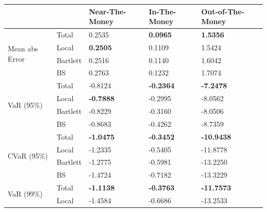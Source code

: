 \documentclass[letterpaper,12pt,titlepage,oneside,final]{book}
\numberwithin{equation}{section}
\theoremstyle{definition}
\begin{document}
\begin{table}[htp!]
	\centering
	\begin{tabular}{ll|l|l|l|}
	\cline{3-5}
														  &          & Near-The-Money   & In-The-Money     & Out-of-The-Money  \\ \hline
	\multicolumn{1}{|l|}{\multirow{4}{*}{Mean abs Error}} & Total    & 0.2535           & \textbf{0.0965}  & \textbf{1.5356}   \\ 
	\multicolumn{1}{|l|}{}                                & Local    & \textbf{0.2505}  & 0.1109           & 1.5424            \\ 
	\multicolumn{1}{|l|}{}                                & Bartlett & 0.2516           & 0.1140           & 1.6042            \\ 
	\multicolumn{1}{|l|}{}                                & BS       & 0.2763           & 0.1232           & 1.7074            \\ \hline
	\multicolumn{1}{|l|}{\multirow{4}{*}{VaR (95\%)}}     & Total    & -0.8124          & \textbf{-0.2364} & \textbf{-7.2478}  \\ 
	\multicolumn{1}{|l|}{}                                & Local    & \textbf{-0.7888} & -0.2995          & -8.0562           \\ 
	\multicolumn{1}{|l|}{}                                & Bartlett & -0.8229          & -0.3160          & -8.0506           \\  
	\multicolumn{1}{|l|}{}                                & BS       & -0.8683          & -0.4262          & -8.7359           \\ \hline
	\multicolumn{1}{|l|}{\multirow{4}{*}{CVaR (95\%)}}    & Total    & \textbf{-1.0475} & \textbf{-0.3452} & \textbf{-10.9438} \\ 
	\multicolumn{1}{|l|}{}                                & Local    & -1.2335          & -0.5405          & -11.8778          \\  
	\multicolumn{1}{|l|}{}                                & Bartlett & -1.2775          & -0.5981          & -13.2250          \\  
	\multicolumn{1}{|l|}{}                                & BS       & -1.4724          & -0.7182          & -13.3229          \\ \hline
	\multicolumn{1}{|l|}{\multirow{4}{*}{VaR (99\%)}}     & Total    & \textbf{-1.1138} & \textbf{-0.3763} & \textbf{-11.7573} \\  
	\multicolumn{1}{|l|}{}                                & Local    & -1.4584          & -0.6686          & -13.2533          \\ 

\end{tabular}
\end{table}
\end{document}
